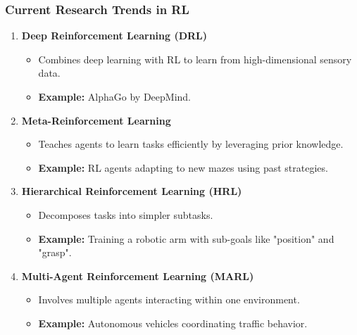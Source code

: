 \documentclass{beamer}
\begin{document}
\begin{frame}[fragile]
    \frametitle{Current Research Trends in RL}
    \begin{enumerate}
        \item \textbf{Deep Reinforcement Learning (DRL)}
        \begin{itemize}
            \item Combines deep learning with RL to learn from high-dimensional sensory data.
            \item \textbf{Example:} AlphaGo by DeepMind.
        \end{itemize}

        \item \textbf{Meta-Reinforcement Learning}
        \begin{itemize}
            \item Teaches agents to learn tasks efficiently by leveraging prior knowledge.
            \item \textbf{Example:} RL agents adapting to new mazes using past strategies.
        \end{itemize}
        
        \item \textbf{Hierarchical Reinforcement Learning (HRL)}
        \begin{itemize}
            \item Decomposes tasks into simpler subtasks.
            \item \textbf{Example:} Training a robotic arm with sub-goals like "position" and "grasp".
        \end{itemize}

        \item \textbf{Multi-Agent Reinforcement Learning (MARL)}
        \begin{itemize}
            \item Involves multiple agents interacting within one environment.
            \item \textbf{Example:} Autonomous vehicles coordinating traffic behavior.
        \end{itemize}
    \end{enumerate}
\end{frame}
\end{document}
